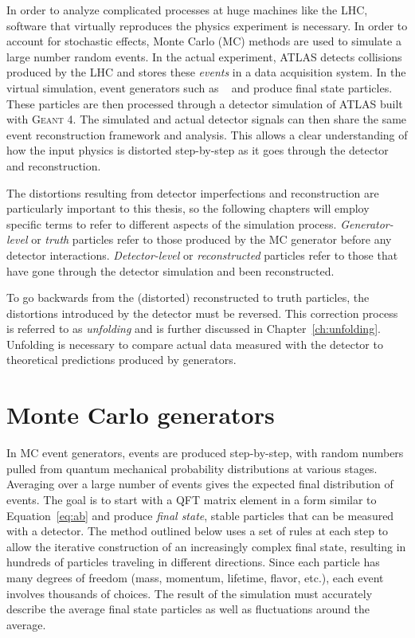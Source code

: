 In order to analyze complicated processes at huge machines like the LHC, software that virtually reproduces the physics experiment is necessary. In order to account for stochastic effects, Monte Carlo (MC) methods are used to simulate a large number random events.  In the actual experiment, ATLAS detects collisions produced by the LHC and stores these \emph{events} in a data acquisition system. In the virtual simulation, event generators such as \hw~\cite{Herwig} and \py\cite{pythia6} produce final state particles. These particles are then processed through a detector simulation of ATLAS built with \textsc{Geant 4}\cite{bib:g4}. The simulated and actual detector signals can then share the same event reconstruction framework and analysis. This allows a clear understanding of how the input physics is distorted step-by-step as it goes through the detector and reconstruction. 

The distortions resulting from detector imperfections and reconstruction are particularly important to this thesis, so the following chapters will employ specific terms to refer to different aspects of the simulation process. \emph{Generator-level} or \emph{truth} particles refer to those produced by the MC generator before any detector interactions. \emph{Detector-level} or \emph{reconstructed} particles refer to those that have gone through the detector simulation and been reconstructed. 

To go backwards from the (distorted) reconstructed to truth particles, the distortions introduced by the detector must be reversed. This correction process is referred to as \emph{unfolding} and is further discussed in Chapter~\ref{ch:unfolding}. Unfolding is necessary to compare actual data measured with the detector to theoretical predictions produced by generators.
\section{Monte Carlo generators}
In MC event generators, events are produced step-by-step, with random numbers pulled from quantum mechanical probability distributions at various stages\cite{PDG,Sjostrand:2009ad}.  Averaging over a large number of events gives the expected final distribution of events. The goal is to start with a QFT matrix element in a form similar to Equation~\ref{eq:ab} and produce \emph{final state}, stable particles that can be measured with a detector. The method outlined below uses a set of rules at each step to allow the iterative construction of an increasingly complex final state, resulting in hundreds of particles traveling in different directions. Since each particle has many degrees of freedom (mass, momentum, lifetime, flavor, etc.), each event involves thousands of choices. The result of the simulation must accurately describe the average final state particles as well as fluctuations around the average. 


